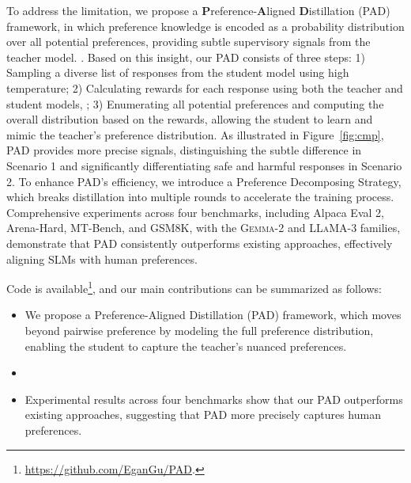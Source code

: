 To address the limitation, we propose a \textbf{P}reference-\textbf{A}ligned \textbf{D}istillation (PAD) framework, in which preference knowledge is encoded as a probability distribution over all potential preferences, providing subtle supervisory signals from the teacher model. 
.
Based on this insight, our PAD consists of three steps: 
1) Sampling a diverse list of responses from the student model using high temperature; 
2) Calculating rewards for each response using both the teacher and student models, ;
3) Enumerating all potential preferences and computing the overall distribution based on the rewards, allowing the student to learn and mimic the teacher's preference distribution. 
As illustrated in Figure~\ref{fig:cmp}, PAD provides more precise signals, distinguishing the subtle difference in Scenario 1 and significantly differentiating safe and harmful responses in Scenario 2. 
To enhance PAD's efficiency, we introduce a Preference Decomposing Strategy, which breaks distillation into multiple rounds to accelerate the training process. Comprehensive experiments across four benchmarks, including Alpaca Eval 2, Arena-Hard, MT-Bench, and GSM8K, with the \textsc{Gemma-2} and \textsc{LLaMA-3} families, demonstrate that PAD consistently outperforms existing approaches, effectively aligning SLMs with human preferences. 

Code is available\footnote{\url{https://github.com/EganGu/PAD}.}, and our main contributions can be summarized as follows:
\begin{itemize}

\item We propose a Preference-Aligned Distillation (PAD) framework, which moves beyond pairwise preference by modeling the full preference distribution, enabling the student to capture the teacher’s nuanced preferences.

\item {}

\item Experimental results across four benchmarks show that our PAD outperforms existing approaches, suggesting that PAD more precisely captures human preferences.

\end{itemize}
